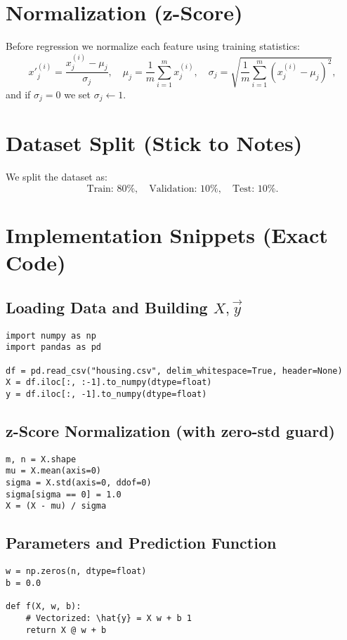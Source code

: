 \documentclass[12pt]{article}
\begin{document}
\section{Normalization (z-Score)}
Before regression we normalize each feature using training statistics:
\[
x'^{(i)}_j=\frac{x^{(i)}_j-\mu_j}{\sigma_j},
\quad
\mu_j=\frac{1}{m}\sum_{i=1}^m x^{(i)}_j,
\quad
\sigma_j=\sqrt{\frac{1}{m}\sum_{i=1}^m (x^{(i)}_j-\mu_j)^2},
\]
and if $\sigma_j=0$ we set $\sigma_j\leftarrow 1$.

\section{Dataset Split (Stick to Notes)}
We split the dataset as:
\[
\text{Train: }80\%,\quad \text{Validation: }10\%,\quad \text{Test: }10\%.
\]


\section{Implementation Snippets (Exact Code)}
\subsection*{Loading Data and Building $X,\vec y$}
\begin{lstlisting}
import numpy as np
import pandas as pd

df = pd.read_csv("housing.csv", delim_whitespace=True, header=None)
X = df.iloc[:, :-1].to_numpy(dtype=float)
y = df.iloc[:, -1].to_numpy(dtype=float)
\end{lstlisting}

\subsection*{z-Score Normalization (with zero-std guard)}
\begin{lstlisting}
m, n = X.shape
mu = X.mean(axis=0)
sigma = X.std(axis=0, ddof=0)
sigma[sigma == 0] = 1.0
X = (X - mu) / sigma
\end{lstlisting}

\subsection*{Parameters and Prediction Function}
\begin{lstlisting}
w = np.zeros(n, dtype=float)
b = 0.0

def f(X, w, b):
    # Vectorized: \hat{y} = X w + b 1
    return X @ w + b
\end{lstlisting}
\end{document}
